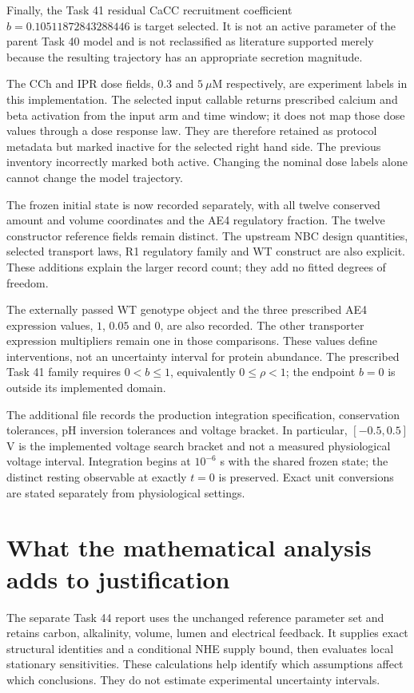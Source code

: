 \documentclass[11pt,a4paper]{article}
\begin{document}
Finally, the Task 41 residual CaCC recruitment coefficient $b=0.10511872843288446$ is target selected. It is not an active parameter of the parent Task 40 model and is not reclassified as literature supported merely because the resulting trajectory has an appropriate secretion magnitude.

The CCh and IPR dose fields, $0.3$ and $5\ \mu$M respectively, are experiment labels in this implementation. The selected input callable returns prescribed calcium and beta activation from the input arm and time window; it does not map those dose values through a dose response law. They are therefore retained as protocol metadata but marked inactive for the selected right hand side. The previous inventory incorrectly marked both active. Changing the nominal dose labels alone cannot change the model trajectory.

The frozen initial state is now recorded separately, with all twelve conserved amount and volume coordinates and the AE4 regulatory fraction. The twelve constructor reference fields remain distinct. The upstream NBC design quantities, selected transport laws, R1 regulatory family and WT construct are also explicit. These additions explain the larger record count; they add no fitted degrees of freedom.

The externally passed WT genotype object and the three prescribed AE4 expression values, $1$, $0.05$ and $0$, are also recorded. The other transporter expression multipliers remain one in those comparisons. These values define interventions, not an uncertainty interval for protein abundance. The prescribed Task 41 family requires $0<b\leq1$, equivalently $0\leq\rho<1$; the endpoint $b=0$ is outside its implemented domain.

The additional file  records the production integration specification, conservation tolerances, pH inversion tolerances and voltage bracket. In particular, $[-0.5,0.5]$ V is the implemented voltage search bracket and not a measured physiological voltage interval. Integration begins at $10^{-6}$ s with the shared frozen state; the distinct resting observable at exactly $t=0$ is preserved. Exact unit conversions are stated separately from physiological settings.

\section{What the mathematical analysis adds to justification}
The separate Task 44 report uses the unchanged reference parameter set and retains carbon, alkalinity, volume, lumen and electrical feedback. It supplies exact structural identities and a conditional NHE supply bound, then evaluates local stationary sensitivities. These calculations help identify which assumptions affect which conclusions. They do not estimate experimental uncertainty intervals.
\end{document}
